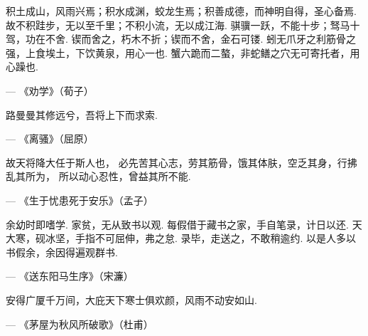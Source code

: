 积土成山，风雨兴焉；积水成渊，蛟龙生焉；积善成德，而神明自得，圣心备焉.
故不积跬步，无以至千里；不积小流，无以成江海.
骐骥一跃，不能十步；驽马十驾，功在不舍.
锲而舍之，朽木不折；锲而不舍，金石可镂.
蚓无爪牙之利筋骨之强，上食埃土，下饮黄泉，用心一也.
蟹六跪而二螯，非蛇鳝之穴无可寄托者，用心躁也.

\hfill
--- 《劝学》（荀子）

路曼曼其修远兮，吾将上下而求索.

\hfill
--- 《离骚》（屈原）

故天将降大任于斯人也，
必先苦其心志，劳其筋骨，饿其体肤，空乏其身，行拂乱其所为，
所以动心忍性，曾益其所不能.

\hfill
--- 《生于忧患死于安乐》（孟子）

余幼时即嗜学.
家贫，无从致书以观.
每假借于藏书之家，手自笔录，计日以还.
天大寒，砚冰坚，手指不可屈伸，弗之怠.
录毕，走送之，不敢稍逾约.
以是人多以书假余，余因得遍观群书.

\hfill
--- 《送东阳马生序》（宋濂）

安得广厦千万间，大庇天下寒士俱欢颜，风雨不动安如山.

\hfill
--- 《茅屋为秋风所破歌》（杜甫）

\hspace{1pt}
